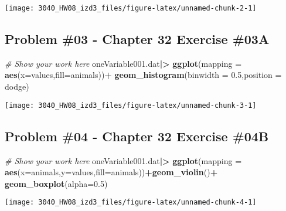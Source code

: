 \documentclass[
]{article}
\newenvironment{Shaded}{\begin{snugshade}}{\end{snugshade}}
\newcommand{\AttributeTok}[1]{\textcolor[rgb]{0.13,0.29,0.53}{#1}}
\newcommand{\CommentTok}[1]{\textcolor[rgb]{0.56,0.35,0.01}{\textit{#1}}}
\newcommand{\FloatTok}[1]{\textcolor[rgb]{0.00,0.00,0.81}{#1}}
\newcommand{\FunctionTok}[1]{\textcolor[rgb]{0.13,0.29,0.53}{\textbf{#1}}}
\newcommand{\NormalTok}[1]{#1}
\newcommand{\SpecialCharTok}[1]{\textcolor[rgb]{0.81,0.36,0.00}{\textbf{#1}}}
\newcommand{\StringTok}[1]{\textcolor[rgb]{0.31,0.60,0.02}{#1}}
\begin{document}
\texttt{[image: 3040\_HW08\_izd3\_files/figure-latex/unnamed-chunk-2-1]}

\newpage

\hypertarget{problem-03---chapter-32-exercise-03a}{%
\subsection{Problem \#03 - Chapter 32 Exercise
\#03A}\label{problem-03---chapter-32-exercise-03a}}

\begin{Shaded}
\begin{Highlighting}[]
\CommentTok{\# Show your work here}
\NormalTok{oneVariable001.dat}\SpecialCharTok{|\textgreater{}}
  \FunctionTok{ggplot}\NormalTok{(}\AttributeTok{mapping =} \FunctionTok{aes}\NormalTok{(}\AttributeTok{x=}\NormalTok{values,}\AttributeTok{fill=}\NormalTok{animals))}\SpecialCharTok{+}
  \FunctionTok{geom\_histogram}\NormalTok{(}\AttributeTok{binwidth =} \FloatTok{0.5}\NormalTok{,}\AttributeTok{position =} \StringTok{\textquotesingle{}dodge\textquotesingle{}}\NormalTok{)}
\end{Highlighting}
\end{Shaded}

\texttt{[image: 3040\_HW08\_izd3\_files/figure-latex/unnamed-chunk-3-1]}

\newpage

\hypertarget{problem-04---chapter-32-exercise-04b}{%
\subsection{Problem \#04 - Chapter 32 Exercise
\#04B}\label{problem-04---chapter-32-exercise-04b}}

\begin{Shaded}
\begin{Highlighting}[]
\CommentTok{\# Show your work here}
\NormalTok{oneVariable001.dat}\SpecialCharTok{|\textgreater{}}
  \FunctionTok{ggplot}\NormalTok{(}\AttributeTok{mapping =} \FunctionTok{aes}\NormalTok{(}\AttributeTok{x=}\NormalTok{animals,}\AttributeTok{y=}\NormalTok{values,}\AttributeTok{fill=}\NormalTok{animals))}\SpecialCharTok{+}\FunctionTok{geom\_violin}\NormalTok{()}\SpecialCharTok{+}
  \FunctionTok{geom\_boxplot}\NormalTok{(}\AttributeTok{alpha=}\FloatTok{0.5}\NormalTok{)}
\end{Highlighting}
\end{Shaded}

\texttt{[image: 3040\_HW08\_izd3\_files/figure-latex/unnamed-chunk-4-1]}
\end{document}
